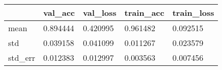 \begin{tabular}{|l|l|l|l|l|}
\toprule \hline
 & val\_acc & val\_loss & train\_acc & train\_loss \\ \hline
\midrule
mean & 0.894444 & 0.420995 & 0.961482 & 0.092515 \\ \hline
std & 0.039158 & 0.041099 & 0.011267 & 0.023579 \\ \hline
std\_err & 0.012383 & 0.012997 & 0.003563 & 0.007456 \\ \hline
\bottomrule
\end{tabular}
